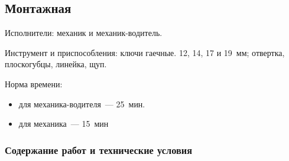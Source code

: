 \subsection{Монтажная}
Исполнители: механик и механик-водитель. 

Инструмент и приспособления: ключи гаечные. 12, 14, 17 и 19~мм; отвертка, плоскогубцы, линейка, щуп. 

Норма времени: 
\begin{itemize}
    \item для механика-водителя~--- 25~мин. 
    \item для механика~--- 15~мин
\end{itemize}

\subsubsection{Содержание работ и технические условия}

